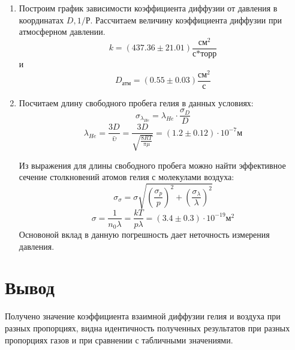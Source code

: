 \documentclass[12pt]{article}
\begin{document}
\begin{enumerate}
        \item Построим график зависимости коэффициента диффузии от 
        давления в координатах $D, 1/Р$. Рассчитаем величину коэффициента диффузии при атмосферном 
        давлении.
        \[ k = (437.36 \pm 21.01)\frac{\text{см}^2}{\text{с*торр}}\]
        и 
        \[ \boxed {D_{\text{атм}} = (0.55\pm 0.03)\frac{\text{см}^2}{\text{с}}}\]
        
        \item Посчитаем длину свободного пробега гелия в данных условиях:
        \begin{equation}
        \sigma_{\lambda_{He}} = \lambda_{He}\cdot \frac{\sigma_D}{D}
        \end{equation}
        \begin{equation}
        \lambda_{He} = \frac{3D}{\bar{\upsilon}} = \frac{3D}{\sqrt{\frac{8RT}{\pi \mu}}}= ( 1.2 \pm 0.12 ) \cdot 10^{-7} \text{м}
        \end{equation}
        
        Из выражения для длины свободного пробега можно найти эффективное сечение столкновений атомов гелия с молекулами воздуха:
        \begin{equation}
        \sigma_\sigma = \sigma \sqrt{(\frac{\sigma_p}{p})^2+(\frac{\sigma_\lambda}{\lambda})^2}
        \end{equation}
        \begin{equation}
        \sigma = \frac{1}{n_0\lambda} = \frac{kT}{p\lambda}= ( 3.4 \pm 0.3 ) \cdot 10^{-19} \text{м}^2
        \end{equation}
        Основоной вклад в данную погрешность дает неточность измерения давления.

    \end{enumerate}
    \section{Вывод}
        Получено значение коэффициента взаимной диффузии гелия и воздуха при разных пропорциях, видна идентичность полученных результатов при разных пропорциях газов и при сравнении с табличными значениями.
    
\end{document}
